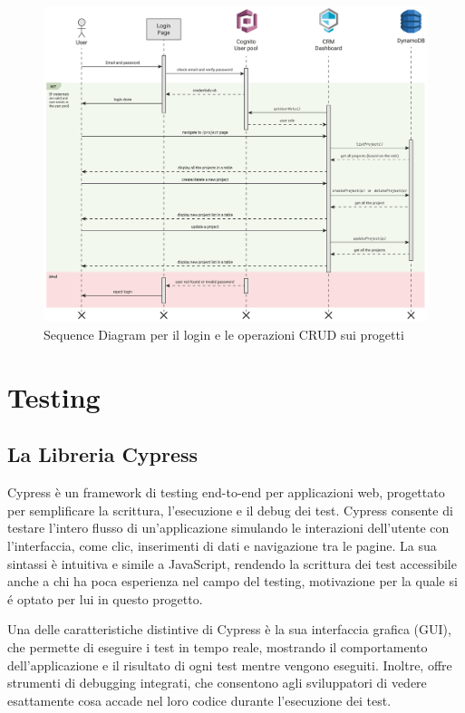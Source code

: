 \documentclass[target=bach,aauheader=,style=]{thud}
\begin{document}
\begin{figure}[H]
    \centering
    \includegraphics[width=1\textwidth]{img/diagrammi/sequence.pdf} 
    \caption{Sequence Diagram per il login e le operazioni CRUD sui progetti}
\end{figure}

\chapter{Testing}

\section{La Libreria Cypress}
Cypress è un framework di testing end-to-end per applicazioni web, progettato per semplificare la scrittura, l'esecuzione e il debug dei test. Cypress consente di testare l'intero flusso di un'applicazione simulando le interazioni dell'utente con l'interfaccia, come clic, inserimenti di dati e navigazione tra le pagine. La sua sintassi è intuitiva e simile a JavaScript, rendendo la scrittura dei test accessibile anche a chi ha poca esperienza nel campo del testing, motivazione per la quale si é optato per lui in questo progetto.

\noindent Una delle caratteristiche distintive di Cypress è la sua interfaccia grafica (GUI), che permette di eseguire i test in tempo reale, mostrando il comportamento dell'applicazione e il risultato di ogni test mentre vengono eseguiti. Inoltre, offre strumenti di debugging integrati, che consentono agli sviluppatori di vedere esattamente cosa accade nel loro codice durante l'esecuzione dei test.
\end{document}
